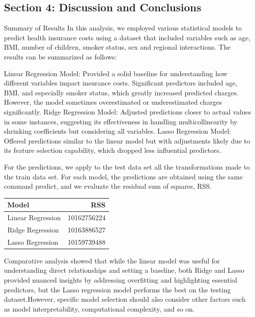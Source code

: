 \documentclass[
  12pt,
]{article}
\begin{document}
\newpage

\subsection{Section 4: Discussion and
Conclusions}\label{section-4-discussion-and-conclusions}

Summary of Results In this analysis, we employed various statistical
models to predict health insurance costs using a dataset that included
variables such as age, BMI, number of children, smoker status, sex and
regional interactions. The results can be summarized as follows:

Linear Regression Model: Provided a solid baseline for understanding how
different variables impact insurance costs. Significant predictors
included age, BMI, and especially smoker status, which greatly increased
predicted charges. However, the model sometimes overestimated or
underestimated charges significantly. Ridge Regression Model: Adjusted
predictions closer to actual values in some instances, suggesting its
effectiveness in handling multicollinearity by shrinking coefficients
but considering all variables. Lasso Regression Model: Offered
predictions similar to the linear model but with adjustments likely due
to its feature selection capability, which dropped less influential
predictors.

For the predictions, we apply to the test data set all the
transformations made to the train data set. For each model, the
predictions are obtained using the same command predict, and we evaluate
the residual sum of squares, RSS.

\begin{longtable}[]{@{}lr@{}}
\toprule\noalign{}
Model & RSS \\
\midrule\noalign{}
\endhead
\bottomrule\noalign{}
\endlastfoot
Linear Regression & 10162756224 \\
Ridge Regression & 10163886527 \\
Lasso Regression & 10159739488 \\
\end{longtable}

Comparative analysis showed that while the linear model was useful for
understanding direct relationships and setting a baseline, both Ridge
and Lasso provided nuanced insights by addressing overfitting and
highlighting essential predictors, but the Lasso regression model
performs the best on the testing dataset.However, specific model
selection should also consider other factors such as model
interpretability, computational complexity, and so on.
\end{document}
